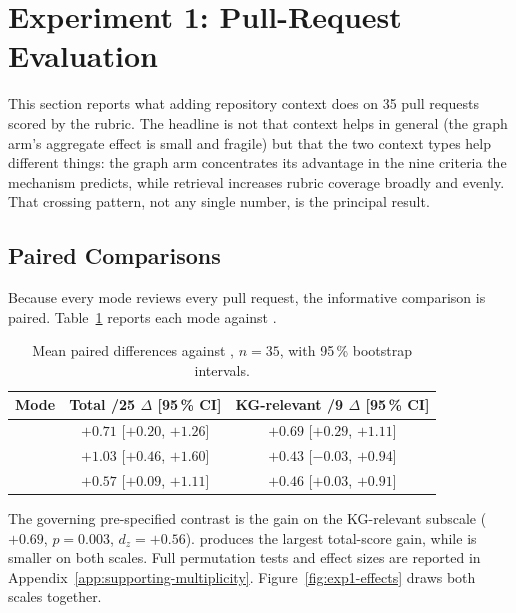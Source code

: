 \section{Experiment 1: Pull-Request Evaluation}
\label{sec:results-exp1}

This section reports what adding repository context does on 35 pull
requests scored by the rubric. The headline is not that context helps in general (the
graph arm's aggregate effect is small and fragile) but that the two
context types help different things: the graph arm concentrates its advantage in the nine
criteria the mechanism predicts, while retrieval increases rubric coverage
broadly and evenly. That crossing pattern, not any single number, is the
principal result.

\subsection{Paired Comparisons}
\label{sec:results-exp1-paired}

Because every mode reviews every pull request, the informative comparison is
paired. Table~\ref{tab:exp1-deltas} reports each mode against \baseline{}.

\begin{table}[htbp]
    \centering
    \caption{Mean paired differences against \baseline{}, $n = 35$, with
             95\,\% bootstrap intervals.}
    \label{tab:exp1-deltas}
    \small
    \begin{tabular}{lcc}
        \toprule
        Mode & Total /25 $\Delta$ [95\,\% CI] & KG-relevant /9 $\Delta$ [95\,\% CI] \\
        \midrule
        \kg{}     & $+0.71$ [$+0.20$, $+1.26$] & $+0.69$ [$+0.29$, $+1.11$] \\
        \rag{}    & $+1.03$ [$+0.46$, $+1.60$] & $+0.43$ [$-0.03$, $+0.94$] \\
        \hybrid{} & $+0.57$ [$+0.09$, $+1.11$] & $+0.46$ [$+0.03$, $+0.91$] \\
        \bottomrule
    \end{tabular}
\end{table}

The governing pre-specified contrast is the \kg{} gain on the KG-relevant
subscale ($+0.69$, $p = 0.003$, $d_z = +0.56$). \rag{} produces the
largest total-score gain, while \hybrid{} is smaller on both scales. Full
permutation tests and effect sizes are reported in
Appendix~\ref{app:supporting-multiplicity}.
Figure~\ref{fig:exp1-effects} draws both scales together.

